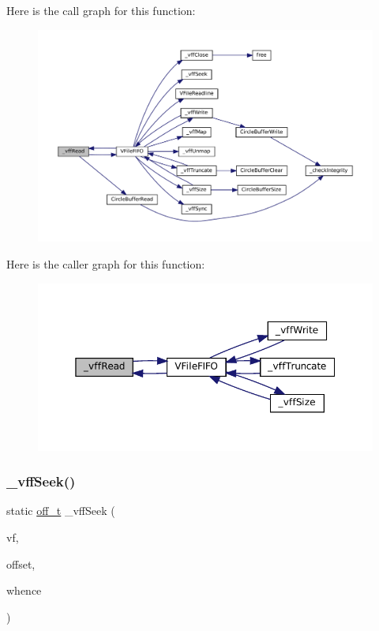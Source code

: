 Here is the call graph for this function\+:
\nopagebreak
\begin{figure}[H]
\begin{center}
\leavevmode
\includegraphics[width=350pt]{vfs-fifo_8c_aebf7afd08be7a4e51c2ae0f17dde12f8_cgraph}
\end{center}
\end{figure}
Here is the caller graph for this function\+:
\nopagebreak
\begin{figure}[H]
\begin{center}
\leavevmode
\includegraphics[width=350pt]{vfs-fifo_8c_aebf7afd08be7a4e51c2ae0f17dde12f8_icgraph}
\end{center}
\end{figure}
\mbox{\label{vfs-fifo_8c_a7e56f8b931c2f4d604b1060e0e641210}} 
\subsubsection{\texorpdfstring{\+\_\+vff\+Seek()}{\_vffSeek()}}
{\footnotesize\ttfamily static \mbox{\hyperlink{__builder_8h_a53066be3c3a28d8b8ccb3dc95c1e49b1}{off\+\_\+t}} \+\_\+vff\+Seek (\begin{DoxyParamCaption}\item[{struct V\+File $\ast$}]{vf,  }\item[{\mbox{\hyperlink{__builder_8h_a53066be3c3a28d8b8ccb3dc95c1e49b1}{off\+\_\+t}}}]{offset,  }\item[{\mbox{\hyperlink{ioapi_8h_a787fa3cf048117ba7123753c1e74fcd6}{int}}}]{whence }\end{DoxyParamCaption})\hspace{0.3cm}{\ttfamily [static]}}

